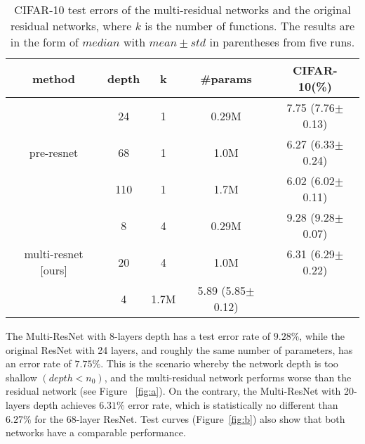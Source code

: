 \documentclass[journal]{IEEEtran}
\begin{document}
\begin{table}[!htb]
\centering
\begin{tabular}{||c c c c c ||} 
\hline
method & depth & k & \#params & CIFAR-10(\%)   \\ 
\hline\hline
\multirow{3}{5em}{pre-resnet \cite{he2016identity}} 
& 24 & 1& 0.29M & 7.75 \tiny(7.76$\pm$0.13) \\ 
& 68 & 1& 1.0M & 6.27 \tiny(6.33$\pm$0.24) \\ 
& 110 & 1& 1.7M & 6.02 \tiny(6.02$\pm$0.11)  \\ 
\hline
\multirow{3}{5em}{multi-resnet [ours]} 
& 8 & 4& 0.29M & 9.28 \tiny(9.28$\pm$0.07) \\ 
& 20 & 4& 1.0M & 6.31 \tiny(6.29$\pm$0.22) \\ \& 30 & 4& 1.7M & 5.89 \tiny(5.85$\pm$0.12) \\ 

\hline

\end{tabular}
\caption{CIFAR-10 test errors of the multi-residual networks and the original residual networks, where $k$ is the number of functions. The results are in the form of $median$ with $mean\pm std$ in parentheses from five runs.}
\label{table:2}
\end{table}


The Multi-ResNet with 8-layers depth has a test error rate of $9.28\%$, while the original ResNet with 24 layers, and roughly the same number of parameters, has an error rate of $7.75\%$. This is the scenario whereby the network depth is too shallow $(depth<n_0)$, and the multi-residual network performs worse than the residual network (see Figure~ \ref{fig:a}). On the contrary, the Multi-ResNet with 20-layers depth achieves $6.31\%$ error rate, which is statistically no different than  $6.27\%$ for the 68-layer ResNet.  Test curves (Figure~\ref{fig:b}) also show that both networks have a comparable performance.
\end{document}
